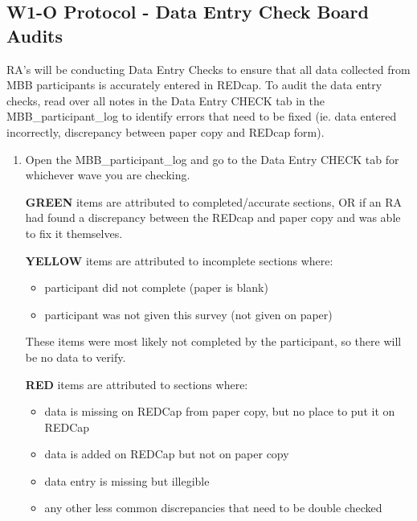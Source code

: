 \documentclass[
]{book}
\providecommand{\tightlist}{%
  \setlength{\itemsep}{0pt}\setlength{\parskip}{0pt}}
\begin{document}
\hypertarget{w1-o-protocol---data-entry-check-board-audits}{%
\subsection{W1-O Protocol - Data Entry Check Board Audits}\label{w1-o-protocol---data-entry-check-board-audits}}

RA's will be conducting Data Entry Checks to ensure that all data collected from MBB participants is accurately entered in REDcap. To audit the data entry checks, read over all notes in the Data Entry CHECK tab in the MBB\_participant\_log to identify errors that need to be fixed (ie. data entered incorrectly, discrepancy between paper copy and REDcap form).

\begin{enumerate}
\def\labelenumi{\arabic{enumi}.}
\item
  Open the MBB\_participant\_log and go to the Data Entry CHECK tab for whichever wave you are checking.

  \textbf{GREEN} items are attributed to completed/accurate sections, OR if an RA had found a discrepancy between the REDcap and paper copy and was able to fix it themselves.

  \textbf{YELLOW} items are attributed to incomplete sections where:

  \begin{itemize}
  \tightlist
  \item
    participant did not complete (paper is blank)
  \item
    participant was not given this survey (not given on paper)
  \end{itemize}

  These items were most likely not completed by the participant, so there will be no data to verify.

  \textbf{RED} items are attributed to sections where:

  \begin{itemize}
  \tightlist
  \item
    data is missing on REDCap from paper copy, but no place to put it on REDCap
  \item
    data is added on REDCap but not on paper copy
  \item
    data entry is missing but illegible
  \item
    any other less common discrepancies that need to be double checked
  \end{itemize}


\end{enumerate}
\end{document}
